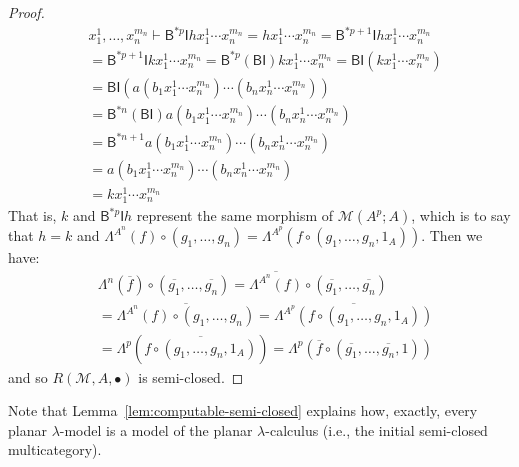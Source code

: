 \documentclass{llncs}
\begin{document}
\begin{proof}
  \begin{align*}
    & x_1^1 ,\ldots, x_n^{m_n} \vdash \mathsf{B}^{*p}\mathsf{I}h x_1^1 \cdots x_n^{m_n}
    = hx_1^1 \cdots x_n^{m_n}
    = \mathsf{B}^{*p+1}\mathsf{I}hx_1^1\cdots x_n^{m_n}
    \\&= \mathsf{B}^{*p+1}\mathsf{I}kx_1^1 \cdots x_n^{m_n}
    = \mathsf{B}^{*p}(\mathsf{BI})kx_1^1 \cdots x_n^{m_n}
    = \mathsf{BI}(kx_1^1 \cdots x_n^{m_n})
    \\&= \mathsf{BI}(a(b_1x_1^1 \cdots x_n^{m_n}) \cdots (b_nx_n^1 \cdots x_n^{m_n}))
    \\&= \mathsf{B}^{*n}(\mathsf{BI})a(b_1x_1^1 \cdots x_n^{m_n}) \cdots (b_nx_n^1 \cdots x_n^{m_n})
    \\&= \mathsf{B}^{*n+1}a(b_1x_1^1 \cdots x_n^{m_n}) \cdots (b_nx_n^1 \cdots x_n^{m_n})
    \\&= a(b_1x_1^1 \cdots x_n^{m_n}) \cdots (b_nx_n^1 \cdots x_n^{m_n})
    \\&= kx_1^1\cdots x_n^{m_n}
  \end{align*}
  That is, $k$ and $\mathsf{B}^{*p}\mathsf{I}h$ represent the same morphism of $\mathcal{M}(A^p;A)$, which is to say that $h = k$ and $\Lambda^{A^n}(f) \circ (g_1,\ldots,g_n) = \Lambda^{A^p}(f \circ (g_1,\ldots,g_n,1_A))$. Then we have:
  \begin{align*}
    &\Lambda^n(\overline{f}) \circ (\overline{g_1},\ldots,\overline{g_n})
      = \overline{\Lambda^{A^n}(f)} \circ (\overline{g_1},\ldots,\overline{g_n})
    \\&= \overline{\Lambda^{A^n}(f) \circ (g_1,\ldots,g_n)}
    = \overline{\Lambda^{A^p}(f \circ (g_1,\ldots,g_n,1_A))}
    \\&= \Lambda^p(\overline{f\circ (g_1,\ldots,g_n,1_A)})
    = \Lambda^p(\overline{f} \circ (\overline{g_1},\ldots,\overline{g_n},1))
  \end{align*}
  and so $R(\mathcal{M},A,\bullet)$ is semi-closed.
\end{proof}
Note that Lemma~\ref{lem:computable-semi-closed} explains how, exactly, every planar $\lambda$-model is a model of the planar $\lambda$-calculus (i.e., the initial semi-closed multicategory).
\end{document}
